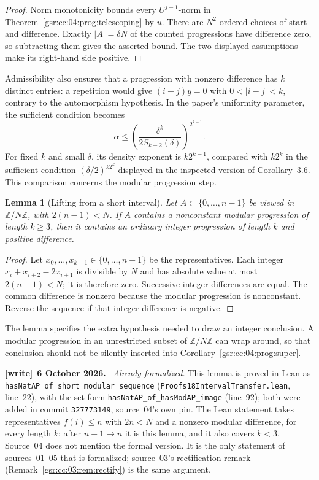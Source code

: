 \documentclass[11pt,letterpaper]{article}
\numberwithin{equation}{section}
\newtheorem{lemma}[theorem]{Lemma}
\theoremstyle{definition}
\theoremstyle{remark}
\newcommand{\Z}{\mathbb Z}
\newcommand{\1}{\mathbf 1}
\newcommand{\file}[1]{\nolinkurl{#1}}
\newenvironment{writenote}[1][]{\par\smallskip\begingroup\small
 \noindent\textbf{[write]}\if\relax\detokenize{#1}\relax\else~\textbf{#1.}\fi\ }%
 {\par\endgroup\smallskip}
\begin{document}
\begin{proof}
Norm monotonicity bounds every \(U^{j-1}\)-norm in
Theorem~\ref{gsr:cc:04:prog:telescoping} by \(u\).  There are \(N^2\) ordered
choices of start and difference.  Exactly \(|A|=\delta N\) of the
counted progressions have difference zero, so subtracting them gives
the asserted bound.  The two displayed assumptions make its
right-hand side positive.
\end{proof}

Admissibility also ensures that a progression with nonzero difference
has \(k\) distinct entries: a repetition would give
\((i-j)y=0\) with \(0<|i-j|<k\), contrary to the automorphism hypothesis.
In the paper's uniformity parameter, the sufficient condition becomes
\[
 \alpha\leq
 \left(\frac{\delta^k}{2S_{k-2}(\delta)}\right)^{2^{k-1}}.
\]
For fixed \(k\) and small \(\delta\), its density exponent is
\(k2^{k-1}\), compared with \(k2^k\) in the sufficient condition
\((\delta/2)^{k2^k}\) displayed in the inspected version of
Corollary~3.6.  This comparison concerns the modular progression step.

\begin{lemma}[Lifting from a short interval]\label{gsr:cc:04:prog:lift}
Let \(A\subset\{0,\ldots,n-1\}\) be viewed in \(\Z/N\Z\), with
\(2(n-1)<N\).  If \(A\) contains a nonconstant modular progression
of length \(k\geq3\), then it contains an ordinary integer progression
of length \(k\) and positive difference.
\end{lemma}

\begin{proof}
Let \(x_0,\ldots,x_{k-1}\in\{0,\ldots,n-1\}\) be the representatives.
Each integer \(x_i+x_{i+2}-2x_{i+1}\) is divisible by \(N\) and has
absolute value at most \(2(n-1)<N\); it is therefore zero.
Successive integer differences are equal.  The common difference is
nonzero because the modular progression is nonconstant.  Reverse the
sequence if that integer difference is negative.
\end{proof}

The lemma specifies the extra hypothesis needed to draw an integer
conclusion.  A modular progression in an unrestricted subset of
\(\Z/N\Z\) can wrap around, so that conclusion should not be silently
inserted into Corollary~\ref{gsr:cc:04:prog:super}.
\begin{writenote}[6 October 2026]
\emph{Already formalized.} This lemma is proved in Lean as \file{hasNatAP_of_short_modular_sequence} (\file{Proofs18IntervalTransfer.lean}, line~22), with the set form \file{hasNatAP_of_hasModAP_image} (line~92); both were added in commit \texttt{327773149}, source~04's own pin. The Lean statement takes representatives $f(i)\le n$ with $2n<N$ and a nonzero modular difference, for every length $k$: after $n-1\mapsto n$ it is this lemma, and it also covers $k<3$. Source~04 does not mention the formal version. It is the only statement of sources~01--05 that is formalized; source~03's rectification remark (Remark~\ref{gsr:cc:03:rem:rectify}) is the same argument.
\end{writenote}
\end{document}
